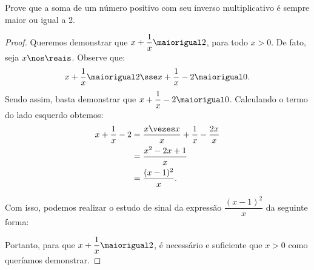 \begin{example}
    Prove que a soma de um número positivo com seu inverso multiplicativo é sempre maior ou igual a 2.
\end{example}

\begin{proof}
    Queremos demonstrar que $x + \dfrac 1 x \maiorigual 2$, para todo $x > 0$. De fato, seja $x \nos \reais$. Observe que:
    \[
        x + \dfrac 1 x \maiorigual 2 \sse x + \dfrac 1 x - 2 \maiorigual 0.
    \]
    Sendo assim, basta demonstrar que $x + \dfrac 1 x - 2 \maiorigual 0$. Calculando o termo do lado esquerdo obtemos:
    \begin{align*}
        x + \dfrac 1 x - 2 &= \dfrac {x \vezes x} x + \dfrac 1 x -  \dfrac {2x} x \\
                           &= \dfrac {x^2 - 2x + 1} x \\
                           &= \dfrac {(x - 1)^2} x.
    \end{align*}

    Com isso, podemos realizar o estudo de sinal da expressão $\dfrac {(x - 1)^2} x$ da seguinte forma:
    \begin{figure}[H]
        \centering
        \caption{}
    \end{figure}

    Portanto, para que $x + \dfrac 1 x \maiorigual 2$, é necessário e suficiente que $x > 0$ como queríamos demonstrar.
\end{proof}